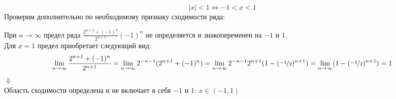 \documentclass{article}
\begin{document}
$$\left\lvert x\right\rvert < 1 \Leftrightarrow -1 < x < 1$$
Проверим дополнительно по необходимому признаку сходимости ряда:
\begin{center}
    При $n \rightarrow \infty$ предел ряда $\frac{2^{n+1} + (-1)^{n}}{2^{n+1}}(-1)^n$ не определяется и знакопеременен на $-1$ и $1$. \\
    Для $x = 1$ предел приобретает следующий вид:
    $$\lim_{n\rightarrow \infty} \frac{2^{n+1} + (-1)^{n}}{2^{n+1}} = \lim_{n\rightarrow \infty} 2^{-n-1}(2^{n+1} + (-1)^{n}) = \lim_{n\rightarrow \infty} 2^{-n-1}2^{n+1}(1 - (\nicefrac{-1}{2})^{n+1}) = \lim_{n\rightarrow \infty} (1 - (\nicefrac{-1}{2})^{n+1}) = 1$$
    $\Downarrow$ \\
    Область сходимости определена и не включает в себя $-1$ и $1$: $x \in (-1,1)$
\end{center}
\end{document}
